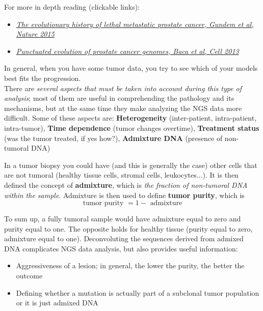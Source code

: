   For more in depth reading (clickable links):
  \begin{itemize}
    \item \href{https://pubmed.ncbi.nlm.nih.gov/25830880/}{\textit{The
    evolutionary history of lethal metastatic prostate cancer, Gundem et al,
    Nature 2015}}
    \item \href{https://pubmed.ncbi.nlm.nih.gov/23622249/}{\textit{Punctuated
    evolution of prostate cancer genomes, Baca et al, Cell 2013}}
  \end{itemize}
  In general, when you have some tumor data, you try to see which of your models
  best fits the progression. \\

  There are \textit{several aspects that must be taken into account during this
  type of analysis}; most of them are useful in comprehending the pathology and
  its mechanisms, but at the same time they make analyzing the NGS data more
  difficult. Some of these aspects are: \textbf{Heterogeneity} (inter-patient,
  intra-patient, intra-tumor), \textbf{Time dependence} (tumor changes
  overtime), \textbf{Treatment status} (was the tumor treated, if yes how?),
  \textbf{Admixture DNA} (presence of non-tumoral DNA)
  
  \begin{definition}
    In a tumor biopsy you could have (and this is generally the case) other
  cells that are not tumoral (healthy tissue cells, stromal cells,
  leukocytes...). It is then defined the concept of \textbf{admixture}, which is
  \textit{the fraction of non-tumoral DNA within the sample}. Admixture is then
  used to define \textbf{tumor purity}, which is
  $$
  \text{tumor purity } = 1 - \text{ admixture}
  $$
  \end{definition}
  To sum up, a fully tumoral sample would have admixture equal to zero and
  purity equal to one. The opposite holds for healthy tissue (purity equal to
  zero, admixture equal to one). Deconvoluting the sequences derived from
  admixed DNA complicates NGS data analysis, but also provides useful
  information:
  \begin{itemize}
    \item Aggressiveness of a lesion; in general, the lower the purity, the
    better the outcome
    \item Defining whether a mutation is actually part of a subclonal tumor
    population or it is just admixed DNA
  \end{itemize}
  
